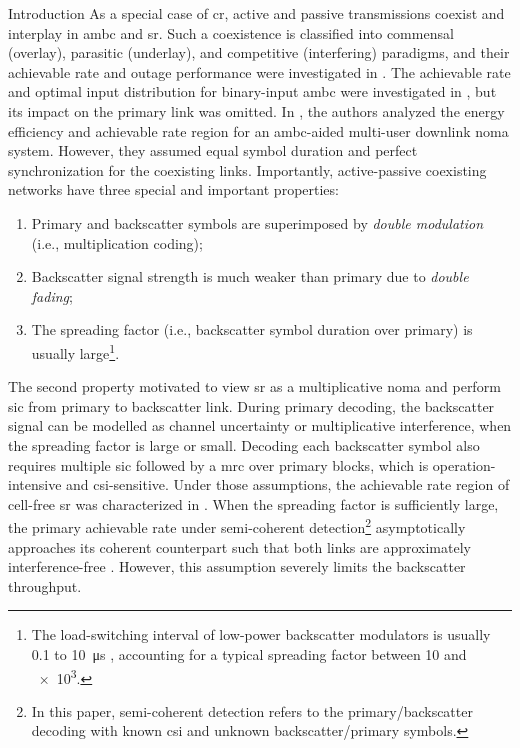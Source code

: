 \begin{section}{Introduction}
	As a special case of \gls{cr}, active and passive transmissions coexist and interplay in \gls{ambc} and \gls{sr}.
	Such a coexistence is classified into commensal (overlay), parasitic (underlay), and competitive (interfering) paradigms, and their achievable rate and outage performance were investigated in \cite{Guo2019b,Ding2020}.
	The achievable rate and optimal input distribution for binary-input \gls{ambc} were investigated in \cite{Qian2019b}, but its impact on the primary link was omitted.
	In \cite{Hassani2023}, the authors analyzed the energy efficiency and achievable rate region for an \gls{ambc}-aided multi-user downlink \gls{noma} system.
	However, they assumed equal symbol duration and perfect synchronization for the coexisting links.
	Importantly, active-passive coexisting networks have three special and important properties:
	\begin{enumerate}
		\item Primary and backscatter symbols are superimposed by \emph{double modulation} (i.e., multiplication coding);
		\item Backscatter signal strength is much weaker than primary due to \emph{double fading};
		\item The spreading factor (i.e., backscatter symbol duration over primary) is usually large\footnote{The load-switching interval of low-power backscatter modulators is usually \num{0.1} to \qty{10}{\us} \cite{Torres2021}, accounting for a typical spreading factor between \num{10} and \num{e3}.}.
	\end{enumerate}
	The second property motivated \cite{Long2020a,Liang2020,Guo2019b,Ding2020,Hassani2023,Zhou2019a,Wu2021a,Xu2021a,Yang2021a,Yang2018,Han2021,Zhang2022,Dai2023} to view \gls{sr} as a multiplicative \gls{noma} and perform \gls{sic} from primary to backscatter link.
	During primary decoding, the backscatter signal can be modelled as channel uncertainty or multiplicative interference, when the spreading factor is large or small.
	Decoding each backscatter symbol also requires multiple \gls{sic} followed by a \gls{mrc} over primary blocks, which is operation-intensive and \gls{csi}-sensitive.
	Under those assumptions, the achievable rate region of cell-free \gls{sr} was characterized in \cite{Dai2023}.
	When the spreading factor is sufficiently large, the primary achievable rate under semi-coherent detection\footnote{In this paper, semi-coherent detection refers to the primary/backscatter decoding with known \gls{csi} and unknown backscatter/primary symbols.} asymptotically approaches its coherent counterpart such that both links are approximately interference-free \cite{Long2020a}.
	However, this assumption severely limits the backscatter throughput.


\end{section}

